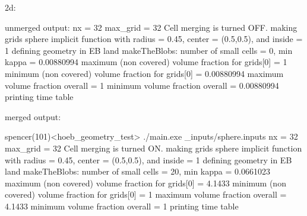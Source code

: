 2d:

unmerged output:
nx = 32
max_grid = 32
Cell merging is turned OFF.
making grids
sphere implicit function with radius = 0.45, center = (0.5,0.5), and inside = 1
defining geometry in EB land
makeTheBlobs: number of small cells = 0, min kappa = 0.00880994
maximum (non covered) volume fraction for grids[0] = 1
minimum (non covered) volume fraction for grids[0] = 0.00880994
maximum volume fraction overall = 1
minimum volume fraction overall = 0.00880994
printing time table 

merged output:

spencer(101)<hoeb_geometry_test> ./main.exe _inputs/sphere.inputs 
nx = 32
max_grid = 32
Cell merging is turned ON.
making grids
sphere implicit function with radius = 0.45, center = (0.5,0.5), and inside = 1
defining geometry in EB land
makeTheBlobs: number of small cells = 20, min kappa = 0.0661023
maximum (non covered) volume fraction for grids[0] = 4.1433
minimum (non covered) volume fraction for grids[0] = 1
maximum volume fraction overall = 4.1433
minimum volume fraction overall = 1
printing time table 

